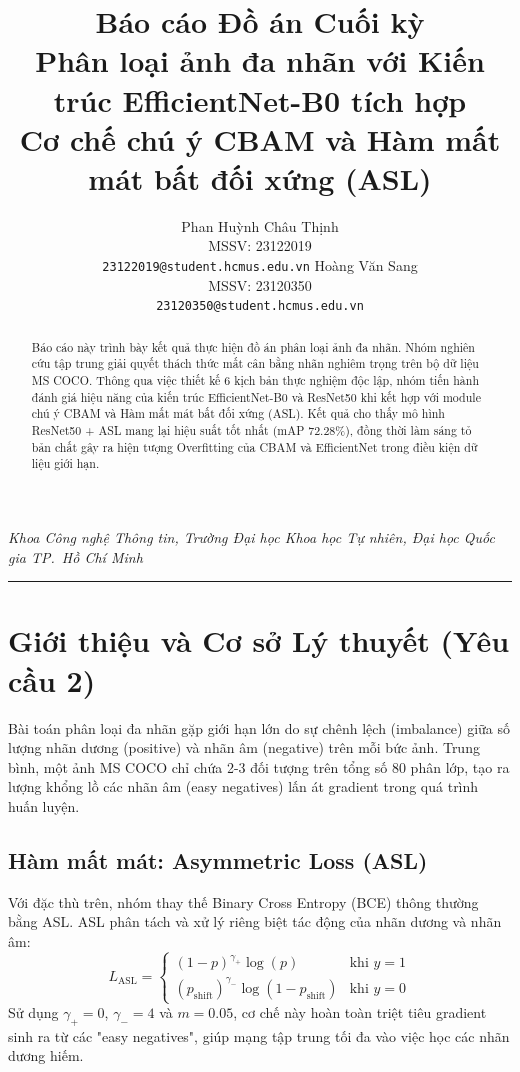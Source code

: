 \documentclass{article}
\title{%
  \textbf{Báo cáo Đồ án Cuối kỳ}\\[4pt]
  {\large Phân loại ảnh đa nhãn với Kiến trúc EfficientNet-B0 tích hợp}\\
  {\large Cơ chế chú ý CBAM và Hàm mất mát bất đối xứng (ASL)}
}
\author{%
  Phan Huỳnh Châu Thịnh \\
  MSSV: 23122019 \\
  \texttt{23122019@student.hcmus.edu.vn}
  \And
  Hoàng Văn Sang \\
  MSSV: 23120350 \\
  \texttt{23120350@student.hcmus.edu.vn}
}
\begin{document}
\maketitle

\begin{center}
  {\small
    \textit{Khoa Công nghệ Thông tin,
    Trường Đại học Khoa học Tự nhiên,
    Đại học Quốc gia TP.\ Hồ Chí Minh}
  }
\end{center}

\vspace{6pt}
\noindent\rule{\linewidth}{0.8pt}

\begin{abstract}
Báo cáo này trình bày kết quả thực hiện đồ án phân loại ảnh đa nhãn. Nhóm nghiên cứu tập trung giải quyết thách thức mất cân bằng nhãn nghiêm trọng trên bộ dữ liệu MS COCO. Thông qua việc thiết kế 6 kịch bản thực nghiệm độc lập, nhóm tiến hành đánh giá hiệu năng của kiến trúc EfficientNet-B0 và ResNet50 khi kết hợp với module chú ý CBAM và Hàm mất mát bất đối xứng (ASL). Kết quả cho thấy mô hình ResNet50 + ASL mang lại hiệu suất tốt nhất (mAP 72.28\%), đồng thời làm sáng tỏ bản chất gây ra hiện tượng Overfitting của CBAM và EfficientNet trong điều kiện dữ liệu giới hạn.
\end{abstract}

\section{Giới thiệu và Cơ sở Lý thuyết (Yêu cầu 2)}

Bài toán phân loại đa nhãn gặp giới hạn lớn do sự chênh lệch (imbalance) giữa số lượng nhãn dương (positive) và nhãn âm (negative) trên mỗi bức ảnh. Trung bình, một ảnh MS COCO chỉ chứa 2-3 đối tượng trên tổng số 80 phân lớp, tạo ra lượng khổng lồ các nhãn âm (easy negatives) lấn át gradient trong quá trình huấn luyện.

\subsection{Hàm mất mát: Asymmetric Loss (ASL)}
Với đặc thù trên, nhóm thay thế Binary Cross Entropy (BCE) thông thường bằng ASL. ASL phân tách và xử lý riêng biệt tác động của nhãn dương và nhãn âm:
\begin{equation}
  L_{\mathrm{ASL}} =
  \begin{cases}
    (1-p)^{\gamma_{+}} \log(p) & \text{khi } y = 1 \\
    (p_{\mathrm{shift}})^{\gamma_{-}} \log(1 - p_{\mathrm{shift}}) & \text{khi } y = 0
  \end{cases}
\end{equation}
Sử dụng $\gamma_{+} = 0$, $\gamma_{-} = 4$ và $m = 0.05$, cơ chế này hoàn toàn triệt tiêu gradient sinh ra từ các "easy negatives", giúp mạng tập trung tối đa vào việc học các nhãn dương hiếm.
\end{document}

